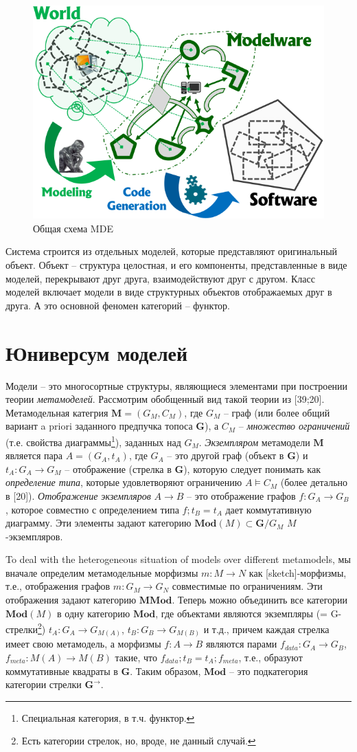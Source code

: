 \documentclass[12pt,a4paper]{extarticle}
\begin{document}
\begin{figure}[htbp]
  \centering
  \includegraphics[width=0.5\linewidth]{mde-general}
  \caption{Общая схема MDE}
  \label{fig:mde-gen-schema}
\end{figure}

Система строится из отдельных моделей, которые представляют оригинальный объект.
Объект -- структура целостная, и его компоненты, представленные в виде моделей,
перекрывают друг друга, взаимодействуют друг с другом. Класс моделей включает
модели в виде структурных объектов отображаемых друг в друга. А это основной
феномен категорий -- функтор.

\section{Юниверсум моделей}
\label{sec:mmodcat}

Модели -- это многосортные структуры, являющиеся элементами при построении теории
\emph{метамоделей}.  Рассмотрим обобщенный вид такой теории из [39;20].
Метамодельная категрия $\mathbf{M}=(G_M,C_M)$, где $G_M$ -- граф (или более
общий вариант a priori заданного предпучка топоса $\mathbf{G}$), а
$C_M$ -- \emph{множество ограничений} (т.е. свойства диаграммы\footnote{Специальная
  категория, в т.ч. функтор.}), заданных над $G_M$.  \emph{Экземпляром} метамодели
$\mathbf{M}$ является пара $A = (G_A, t_A)$, где $G_A$ -- это другой граф
(объект в $\mathbf{G}$) и $t_A: G_A \to G_M$ -- отображение (стрелка в
$\mathbf{G}$), которую следует понимать как \emph{определение типа}, которые
удовлетворяют ограничению $A \models C_M$ (более детально в [20]).
\emph{Отображение экземпляров} $A\to B$ -- это отображение графов $f: G_A\to
G_B$, которое совместно с определением типа $f;t_B = t_A$ дает коммутативную
диаграмму.  Эти элементы задают категорию $\mathbf{Mod}(M) \subset
\mathbf{G}/G_M$ $M$-экземпляров.

To deal with the heterogeneous situation of models over different metamodels, мы
вначале определим метамодельные морфизмы $m: M\to N$ как [sketch]-морфизмы,
т.е., отображения графов $m: G_M\to G_N$ совместимые по ограничениям.  Эти
отображения задают категорию $\mathbf{MMod}$.  Теперь можно объединить все
категории $\mathbf{Mod}(M)$ в одну категорию $\mathbf{Mod}$, где объектами
являются экземпляры (= G-стрелки\footnote{Есть категории стрелок, но, вроде, не
  данный случай.}) $t_A: G_A\to G_{M(A)}$,
$t_B: G_B\to G_{M(B)}$ и т.д., причем каждая стрелка имеет свою метамодель, а
морфизмы $f:A\to B$ являются парами $f_{data}: G_A\to G_B$,
$f_{meta}: M(A) \to M(B)$ такие, что $f_{data};t_B = t_A; f_{meta}$, т.е.,
образуют коммутативные квадраты в $\mathbf{G}$.  Таким образом, $\mathbf{Mod}$
-- это подкатегория категории стрелки $\mathbf{G}^{\to}$.
\end{document}
